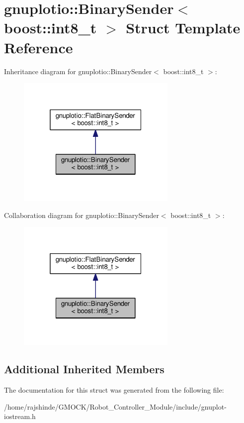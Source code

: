 \hypertarget{structgnuplotio_1_1_binary_sender_3_01boost_1_1int8__t_01_4}{}\section{gnuplotio\+:\+:Binary\+Sender$<$ boost\+:\+:int8\+\_\+t $>$ Struct Template Reference}
\label{structgnuplotio_1_1_binary_sender_3_01boost_1_1int8__t_01_4}


Inheritance diagram for gnuplotio\+:\+:Binary\+Sender$<$ boost\+:\+:int8\+\_\+t $>$\+:
\nopagebreak
\begin{figure}[H]
\begin{center}
\leavevmode
\includegraphics[width=217pt]{structgnuplotio_1_1_binary_sender_3_01boost_1_1int8__t_01_4__inherit__graph}
\end{center}
\end{figure}


Collaboration diagram for gnuplotio\+:\+:Binary\+Sender$<$ boost\+:\+:int8\+\_\+t $>$\+:
\nopagebreak
\begin{figure}[H]
\begin{center}
\leavevmode
\includegraphics[width=217pt]{structgnuplotio_1_1_binary_sender_3_01boost_1_1int8__t_01_4__coll__graph}
\end{center}
\end{figure}
\subsection*{Additional Inherited Members}


The documentation for this struct was generated from the following file\+:\begin{DoxyCompactItemize}
\item 
/home/rajshinde/\+G\+M\+O\+C\+K/\+Robot\+\_\+\+Controller\+\_\+\+Module/include/gnuplot-\/iostream.\+h\end{DoxyCompactItemize}
